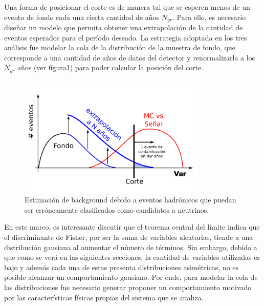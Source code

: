 	Una forma de posicionar el corte es de manera tal que se esperen menos de un evento de fondo cada una cierta cantidad de años $N_{yr}$.
	Para ello, es necesario diseñar un modelo que permita obtener una extrapolación de la cantidad de eventos esperados para el período deseado.
	La estrategia adoptada en los tres análisis fue modelar la cola de la distribución de la muestra de fondo, que corresponde a una cantidad de años de datos del detector y renormalizarla a los $N_{yr}$ años (ver  figura\ref{fig:estimaBackground}) para poder calcular la posición del corte.
	\begin{figure}[ht]
	\begin{center}
	\includegraphics[width=0.8\textwidth]{fig/seleccionAuger/estimaBackground.pdf}
	\caption{Estimación de background debido a eventos hadrónicos que puedan ser erróneamente clasificados como candidatos a neutrinos.}
	\label{fig:estimaBackground}
	\end{center}
	\end{figure}
	
	En este marco, es interesante discutir que el teorema central del límite indica que el discriminante de Fisher, por ser la suma de variables aleatorias, tiende a una distribución gausiana al aumentar el número de términos.
	Sin embargo, debido a que como se verá en las siguientes secciones, la cantidad de variables utilizadas es bajo y además cada una de estas presenta distribuciones asimétricas, no es posible alcanzar un comportamiento gausiano.
	Por ende, para modelar la cola de las distribuciones fue necesario generar proponer un comportamiento motivado por las características físicas propias del sistema que se analiza.
	
